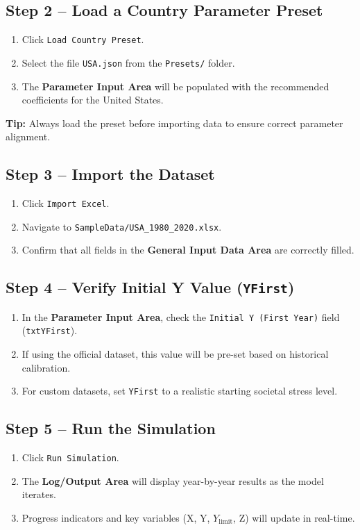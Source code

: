 \documentclass[12pt,a4paper]{article}
\begin{document}
\subsection{Step 2 – Load a Country Parameter Preset}
\begin{enumerate}
    \item Click \texttt{Load Country Preset}.
    \item Select the file \texttt{USA.json} from the \texttt{Presets/} folder.
    \item The \textbf{Parameter Input Area} will be populated with the recommended coefficients for the United States.
\end{enumerate}

\noindent
\textbf{Tip:} Always load the preset before importing data to ensure correct parameter alignment.

\subsection{Step 3 – Import the Dataset}
\begin{enumerate}
    \item Click \texttt{Import Excel}.
    \item Navigate to \texttt{SampleData/USA\_1980\_2020.xlsx}.
    \item Confirm that all fields in the \textbf{General Input Data Area} are correctly filled.
\end{enumerate}

\subsection{Step 4 – Verify Initial Y Value (\texttt{YFirst})}
\begin{enumerate}
    \item In the \textbf{Parameter Input Area}, check the \texttt{Initial Y (First Year)} field (\texttt{txtYFirst}).
    \item If using the official dataset, this value will be pre-set based on historical calibration.
    \item For custom datasets, set \texttt{YFirst} to a realistic starting societal stress level.
\end{enumerate}

\subsection{Step 5 – Run the Simulation}
\begin{enumerate}
    \item Click \texttt{Run Simulation}.
    \item The \textbf{Log/Output Area} will display year-by-year results as the model iterates.
    \item Progress indicators and key variables (X, Y, \(Y_{\text{limit}}\), Z) will update in real-time.
\end{enumerate}
\end{document}
